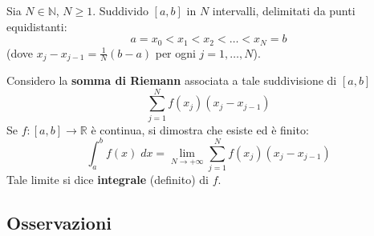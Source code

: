 \documentclass[a4paper]{article}
\theoremstyle{break}
\theoremstyle{break}
\theoremstyle{break}
\theoremstyle{break}
\begin{document}
Sia \( N \in \mathbb{N} \), \( N \ge 1 \). Suddivido \( [a,b] \) in \( N \) intervalli,
delimitati da punti equidistanti:
\[
  a=x_0 < x_1 < x_2 < \ldots < x_N = b
\] 
(dove \( x_j - x_{j-1} = \frac{1}{N}(b-a)\) per ogni \( j=1, \ldots, N \)).

Considero la \textbf{somma di Riemann} associata a tale suddivisione di \( [a,b] \)
\[
  \sum_{j=1}^{N} f(x_j)(x_j-x_{j-1})
\] 
Se \( f: [a,b] \to \mathbb{R} \) è continua, si dimostra che esiste ed è finito:
\[
  \int_{a}^{b}f(x)\;dx = \lim_{N \to +\infty} \sum_{j=1}^{N} f(x_j)(x_j-x_{j-1}) 
\] 
Tale limite si dice \textbf{integrale} (definito) di \( f \).

\subsection{Osservazioni}
\end{document}
